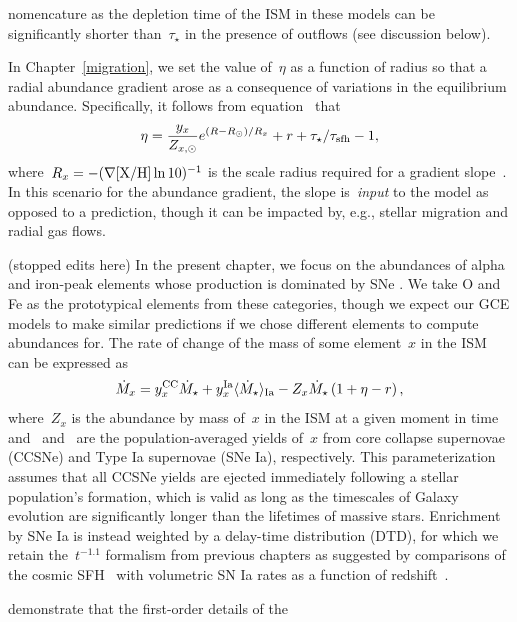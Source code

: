 nomencature as the depletion time of the ISM in these models can be
significantly shorter than~$\tau_\star$ in the presence of outflows (see
discussion below).
\par
In Chapter~\ref{migration}, we set the value of~$\eta$ as a function of radius
so that a radial abundance gradient arose as a consequence of variations in
the equilibrium abundance.
Specifically, it follows from equation~ that
\begin{equation}
\eta = \frac{y_x}{Z_{x,\odot}}
e^{(R - R_\odot) / R_x} + r + \tau_\star / \tau_\text{sfh} - 1,
\end{equation}
where~$R_x = -(\nabla\text{[X/H]} \ln 10)^{-1}$ is the scale radius required for a
gradient slope~.
In this scenario for the abundance gradient, the slope is~\textit{input} to the
model as opposed to a prediction, though it can be impacted by, e.g., stellar
migration and radial gas flows.
\par
{\color{red} (stopped edits here)} In the present chapter, we focus on the
abundances of alpha and
iron-peak elements whose production is dominated by SNe
\citep[e.g.,][]{Johnson2019}.
We take O and Fe as the prototypical elements from these categories, though
we expect our GCE models to make similar predictions if we chose different
elements to compute abundances for.
The rate of change of the mass of some element~$x$ in the ISM can be
expressed as
\begin{equation}
\dot{M}_x = y_\text{$x$}^\text{CC} \dot{M}_\star +
y_\text{$x$}^\text{Ia} \langle \dot{M}_\star \rangle_\text{Ia} -
Z_x \dot{M}_\star \left(1 + \eta - r\right),
\label{outflows:eq:mdot-element-noflow}
\end{equation}
where~$Z_x$ is the abundance by mass of~$x$ in the ISM at a given moment in
time and~ and~ are the population-averaged yields of~$x$
from core collapse supernovae (CCSNe) and Type Ia supernovae (SNe Ia),
respectively.
This parameterization assumes that all CCSNe yields are ejected immediately
following a stellar population's formation, which is valid as long as the
timescales of Galaxy evolution are significantly longer than the lifetimes
of massive stars.
Enrichment by SNe Ia is instead weighted by a delay-time distribution (DTD),
for which we retain the~$t^{-1.1}$ formalism from previous chapters as
suggested by comparisons of the cosmic SFH~\citep[e.g.,][]{Madau2017,
Driver2018} with volumetric SN Ia rates as a function of
redshift~\citep{Maoz2012a, Maoz2012b, Graur2013, Graur2014}.
\par
\citet{Weinberg2017b} demonstrate that the first-order details of the
